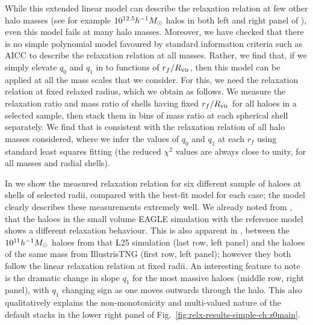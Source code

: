 While this extended linear model can describe the relaxation relation at few other halo masses (see for example $10^{12.5}h^{-1}M_{\odot}$ halos in both left and right panel of ), even this model fails at many halo masses.
Moreover, we have checked that there is no simple polynomial model favoured by standard information criteria such as AICC \citep[][]{2007MNRAS.377L..74L}
to describe the relaxation relation at all masses.
Rather,  we find that, if we 
simply elevate $q_0$ and $q_1$ in  to functions of $r_f/R_{\rm vir}$, then this model
can be applied at all the mass scales that we consider. For this, we need the relaxation relation at fixed relaxed radius, which we obtain as follows. We measure the relaxation ratio and mass ratio of shells having fixed $r_f/R_{\rm vir}$ for all haloes in a selected sample, then stack them in bins
of mass ratio at each spherical shell separately. 
We find that 
is consistent with the relaxation relation of all halo masses considered, where we infer the values of $q_0$ and $q_1$ at each $r_f$ using standard least squares fitting (the reduced $\chi^2$ values are always close to unity, for all masses and radial shells).

In  we show the measured relaxation relation for six different sample of haloes at shells of selected radii, compared with the best-fit model  for each case; the model clearly describes these measurements extremely well. We already noted from , that the haloes in the small volume EAGLE simulation with the reference model shows a different relaxation behaviour. This is also apparent in , between the $10^{11} h^{-1}M_{\odot}$ haloes from that L25 simulation (last row, left panel) and the haloes of the same mass from IllustrisTNG (first row, left panel); however they both follow the linear relaxation relation at fixed radii. An interesting feature to note is the dramatic change in slope $q_1$ for the most massive haloes (middle row, right panel), with $q_1$ changing sign as one moves outwards through the halo. This also qualitatively explains the non-monotonicity and multi-valued nature of the default stacks in the lower right panel of Fig.~\ref{fig:relx-results-simple-ch:z0main}.


